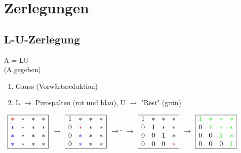 
\section{Zerlegungen}

\subsection{L-U-Zerlegung} \label{L-U-Zerlegung}
	A = LU\\
	(A gegeben)
	\begin{enumerate}
		\item Gauss (Vorwärtsreduktion)
		\item L $\rightarrow$ Pivospalten (rot und blau), U $\rightarrow$ "Rest" (grün) 
	\end{enumerate}\ 
	$\begin{array}{|cccc|}
		\hline 
		\color{red}* & * & * & *\\
		\color{blue}* & * & * & *\\
		\color{blue}* & * & * & *\\
		\color{blue}* & * & * & *\\
		\hline
	\end{array}$
	$\rightarrow$
	$\begin{array}{|cccc|}
		\hline 
		1 & * & * & *\\
		0 & \color{red}* & * & *\\
		0 & \color{blue}* & * & *\\
		0 & \color{blue}* & * & *\\
		\hline
	\end{array}$
	$\rightarrow^{...}\rightarrow$
	$\begin{array}{|cccc|}
		\hline 
		1 & * & * & *\\
		0 & 1 & * & *\\
		0 & 0 & 1 & *\\
		0 & 0 & 0 & \color{red}*\\
		\hline
	\end{array}$
	$\rightarrow$
	$\begin{array}{|cccc|}
		\hline 
		\color{green}1 & \color{green}* & \color{green}* & \color{green}*\\
		0 & \color{green}1 & \color{green}* & \color{green}*\\
		0 & 0 & \color{green}1 & \color{green}*\\
		0 & 0 & 0 & \color{green}1\\
		\hline
	\end{array}$\ \ \ \
